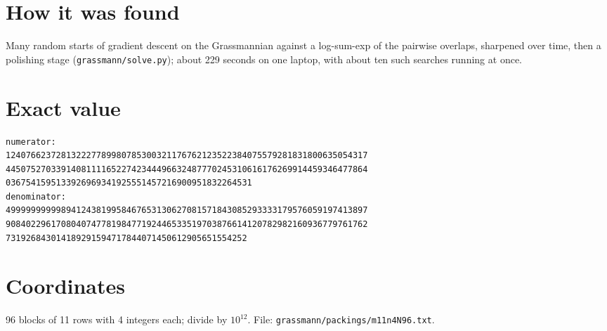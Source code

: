 \documentclass[11pt,a4paper]{article}
\begin{document}
\section{How it was found}
Many random starts of gradient descent on the Grassmannian against a log-sum-exp of the pairwise overlaps, sharpened over time, then a polishing stage (\texttt{grassmann/solve.py}); about 229 seconds on one laptop, with about ten such searches running at once.


\appendix
\section{Exact value}
{\small
\begin{verbatim}
numerator:
124076623728132227789980785300321176762123522384075579281831800635054317
445075270339140811116522742344496632487770245310616176269914459346477864
0367541595133926969341925551457216900951832264531
denominator:
499999999998941243819958467653130627081571843085293333179576059197413897
908402296170804074778198477192446533519703876614120782982160936779761762
731926843014189291594717844071450612905651554252
\end{verbatim}}

\section{Coordinates}
96 blocks of 11 rows with 4 integers each; divide by $10^{12}$. File: \texttt{grassmann/packings/m11n4N96.txt}.
{\tiny
\begin{multicols}{3}
\end{multicols}}
\end{document}
